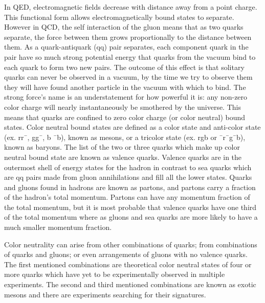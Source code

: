 In QED, electromagnetic fields decrease with distance away from a point charge. This functional form allows electromagnetically bound states to separate.
However in QCD, the self interaction of the gluon means that as two quarks
separate, the force between them grows proportionally to the distance between them. As a
quark-antiquark (qq) pair separates, each component quark in the pair have so much strong potential energy that quarks from the vacuum bind to each quark to form two new pairs. 
The outcome of this effect is that solitary quarks can never be observed in a vacuum, by the time we try to observe them they will have found another particle in the vacuum with which to bind. The strong force's name is an understatement for how powerful it is: any non-zero color charge will nearly instantaneously be smothered by the universe. This means that quarks are confined to zero color charge (or color neutral) bound states. Color neutral bound states are defined as a color state and anti-color state  (ex. rr¯, gg¯, b
¯b),  known as mesons, or a tricolor state (ex. rgb or ¯r¯g¯b), known as baryons. The list of the two or three quarks which make up color neutral bound state are known as valence quarks. Valence quarks are in the outermost shell of energy states for the hadron in contrast to sea quarks which are qq pairs made from gluon annihilations and fill all the lower states. Quarks and gluons found in hadrons are known as partons, and partons carry a fraction of the hadron's total momentum. Partons can have any momentum fraction of the total momentum, but it is most probable that valence quarks have one third of the total momentum where as gluons and sea quarks are more likely to have a much smaller momentum fraction.

Color neutrality can arise from other combinations of quarks; from combinations of quarks and
gluons; or even arrangements of gluons with no valence quarks. The first mentioned combinations are theoretical color neutral states of four or more quarks which have yet to be experimentally observed in multiple experiments. The second and third mentioned combinations are known as exotic mesons and there are experiments searching for their signatures.

